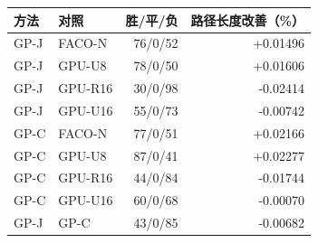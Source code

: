\begin{tabular}{@{}llrr@{}}
\toprule
方法 & 对照 & 胜/平/负 & 路径长度改善（\%） \\ \midrule
GP-J & FACO-N & 76/0/52 & +0.01496 \\
GP-J & GPU-U8 & 78/0/50 & +0.01606 \\
GP-J & GPU-R16 & 30/0/98 & -0.02414 \\
GP-J & GPU-U16 & 55/0/73 & -0.00742 \\
GP-C & FACO-N & 77/0/51 & +0.02166 \\
GP-C & GPU-U8 & 87/0/41 & +0.02277 \\
GP-C & GPU-R16 & 44/0/84 & -0.01744 \\
GP-C & GPU-U16 & 60/0/68 & -0.00070 \\
GP-J & GP-C & 43/0/85 & -0.00682 \\
\bottomrule
\end{tabular}
